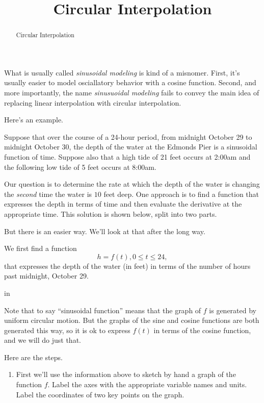 \documentclass{ximera}
\title{Circular Interpolation}
\newcommand{\pskip}{\vskip 0.1 in}
\begin{document}
\begin{abstract}
Circular Interpolation
\end{abstract}
\maketitle


What is usually called \emph{sinusoidal modeling} is kind of a misnomer. First, it's usually easier to model osciallatory behavior with a cosine function. Second, and more importantly, the name \emph{sinusuoidal modeling} fails to convey the main idea of replacing linear interpolation with circular interpolation.

Here's an example.


\begin{example}  \label{E888b0bbdsdsf}
Suppose that over the course of a 24-hour period, from midnight October 29 to midnight October 30, the depth of the water at the Edmonds Pier is a sinusoidal function of time. Suppose also that a high tide of 21 feet occurs at 2:00am and the following low tide of 5 feet occurs at 8:00am. 

Our question is to determine the rate at which the depth of the water is changing the \emph{second} time the water is $10$ feet deep. One approach is to find a function that expresses the depth in terms of time and then evaluate the derivative at the appropriate time. This solution is shown below, split into two parts.

But there is an easier way. We'll look at that after the long way.


\begin{explanation}
We first find a function
\[
    h = f(t) , 0\leq t \leq 24, 
\]
that expresses the depth of the water (in feet) in terms of the number of hours past midnight, October 29. 

\pskip

Note that to say ``sinusoidal function'' means that the graph of $f$ is generated by uniform circular motion. But the graphs of the sine and cosine functions are both generated this way, so it is ok to express $f(t)$ in terms of the cosine function, and we will do just that.

Here are the steps.

\begin{enumerate}

\item  First we'll use the information above to sketch by hand a graph of the function $f$. Label the axes with the appropriate variable names and units. Label the coordinates of two key points on the graph.


\end{enumerate}
\end{explanation}
\end{example}
\end{document}
